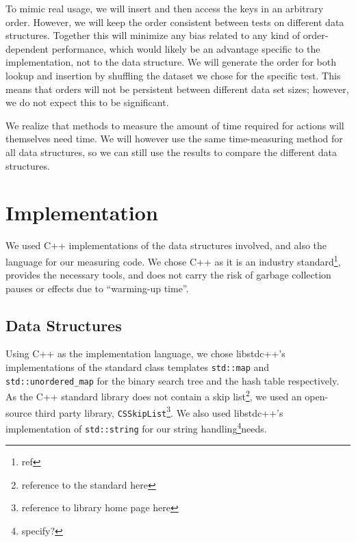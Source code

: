 \documentclass[12pt,a4paper]{article}
\begin{document}
    To mimic real usage, we will insert and then access the keys in an arbitrary order.  However, we will keep the order consistent
    between tests on different data structures.  Together this will minimize any bias related to any kind of order-dependent
    performance, which would likely be an advantage specific to the implementation, not to the data structure. We will
    generate the order for both lookup and insertion by shuffling the dataset we chose for the specific test. This means that
    orders will not be persistent between different data set sizes; however, we do not expect this to be significant.

    We realize that methods to measure the amount of time required for actions will themselves need time. We will however
    use the same time-measuring method for all data structures, so we can still use the results to compare the different
    data structures.

    \section{Implementation}
    \label{sec:implementation}

    We used C++ implementations of the data structures involved, and also the language for our
    measuring code.  We chose C++ as it is an industry standard\footnote{ref}, provides the
    necessary tools, and does not carry the risk of garbage collection pauses or effects due to
    ``warming-up time''.

    \subsection{Data Structures}

    Using C++ as the implementation language, we chose libstdc++'s implementations of the standard class
    templates \texttt{std::map} and \texttt{std::unordered\_map} for the binary search
    tree and the hash table respectively.  As the C++ standard library does not contain a skip
    list\footnote{reference to the standard here}, we used an open-source third party library,
    \texttt{CSSkipList}\footnote{reference to library home page here}.  We also used libstdc++'s
    implementation of \texttt{std::string} for our string handling\footnote{specify?}needs.
\end{document}
